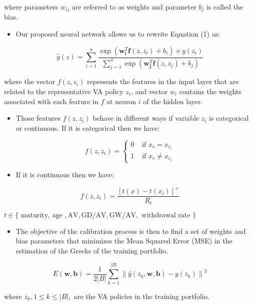 		\;\;\;\;\;\;\centering where parameters $w_{ij}$ are referred to as weights and parameter $b_j$ is called the bias.
		 
		\begin{itemize}
			\setlength\itemsep{0,5em}
			\item Our proposed neural network allows us to rewrite Equation (1) as:
		\end{itemize}			 			 
		\begin{equation}
		\hat{y}(z)=\sum_{i=1}^{n} \frac{\exp \left(\mathbf{w}_{\mathbf{i}}^{T} \mathbf{f}\left(z, z_{i}\right)+b_{i}\right) \times y\left(z_{i}\right)}{\sum_{j=1}^{n} \exp \left(\mathbf{w}_{\mathbf{j}}^{T} \mathbf{f}\left(z, z_{j}\right)+b_{j}\right)}
		\end{equation}
		
		\;\;\;\;\;\;\centering where the vector $f(z,z_i)$ represents the features in the input layer that are related to the representative VA policy $z_i$, and vector $w_i$ contains the weights associated with each feature in $f$ at neuron $i$ of the hidden layer. 
		 
		\begin{itemize}
			\setlength\itemsep{0,5em}
			\item Those features $f(z,z_i)$ behave in different ways if variable $z_i$ is categorical or continuous. If it is categorical then we have:
		\end{itemize}			 			 
		\begin{equation}
		f(z,z_i)=\left\{\begin{array}{ll}{0} & {\text { if } x_{c}=x_{c_{i}}} \\ {1} & {\text { if } x_{c} \neq x_{c_{i}}}\end{array}\right.
		\end{equation}
		\begin{itemize}
			\setlength\itemsep{0,5em}
			\item  If it is continuous then we have:
		\end{itemize}			 			 
		\begin{equation}
		f\left(z, z_{i}\right)=\frac{\left[t(x)-t\left(x_{i}\right)\right]^{+}}{R_{t}}
		\end{equation}
		
		\centering $t \in\{\text { maturity, age }, \mathrm{AV}, \mathrm{GD} / \mathrm{AV}, \mathrm{GW} / \mathrm{AV}, \text { withdrawal rate }\}$
		 
		\begin{itemize}
			\setlength\itemsep{0,5em}
			\item The objective of the calibration process is then to find a set of weights and bias parameters that minimizes the Mean Squared Error (MSE) in the estimation of the Greeks of the training portfolio. 
		\end{itemize}			 			 
		\begin{equation}
		E(\mathbf{w}, \mathbf{b})=\frac{1}{2|B|} \sum_{k=1}^{|B|}\left\|\hat{y}\left(\overline{z}_{k}, \mathbf{w}, \mathbf{b}\right)-y\left(\overline{z}_{k}\right)\right\|^{2}
		\end{equation}
		
		\;\;\;\;\;\;\centering where $\overline{z}_{k}, 1 \leq k \leq|B|,$ are the VA policies in the training portfolio.
		 
